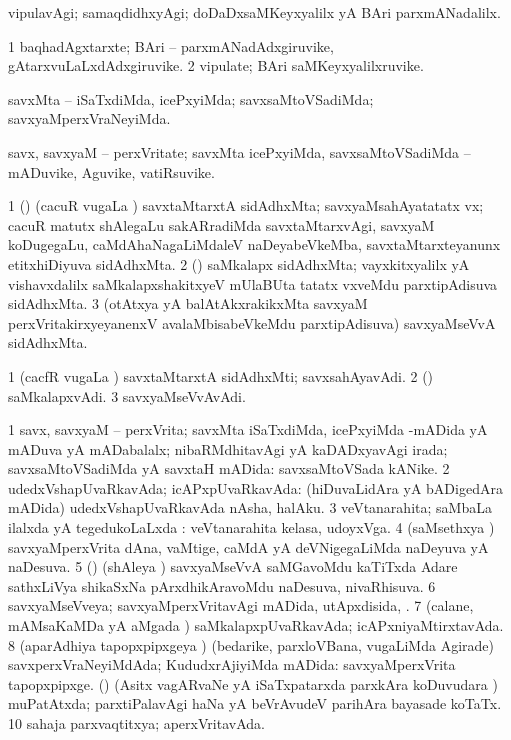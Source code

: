 \bentry
{} 
\gl{\kirxvi}
\expl{}
\bmng
vipulavAgi; samaqdidhxyAgi; doDaDxsaMKeyxyalilx yA BAri parxmANadalilx. 
\emng
\eentry

\bentry 
{} 
\gl{\nA}
\expl{}
\bmng
\bnum
\num{1} baqhadAgxtarxte; BAri -- parxmANadAdxgiruvike, gAtarxvuLaLxdAdxgiruvike. 
\num{2} vipulate; BAri saMKeyxyalilxruvike. 
\enum
\emng
\eentry

\bentry
{} 
\gl{\kirxvi}
\expl{}
\bmng
 savxMta -- iSaTxdiMda, icePxyiMda; savxsaMtoVSadiMda; savxyaMperxVraNeyiMda. 
\emng
\eentry

\bentry
{} 
\gl{\nA}
\expl{}
\bmng
 savx, savxyaM -- perxVritate; savxMta icePxyiMda, savxsaMtoVSadiMda -- mADuvike, Aguvike, vatiRsuvike. 
\emng
\eentry

\bentry 
{} 
\gl{\nA}
\expl{}
\bmng
\hypertarget{voluntarism(1)}{} 
\bnum
\num{1} (\ca) (cacuR \mo vugaLa \vi) savxtaMtarxtA sidAdhxMta; savxyaMsahAyatatatx vx; cacuR matutx shAlegaLu sakARradiMda savxtaMtarxvAgi, savxyaM koDugegaLu, caMdAhaNagaLiMdaleV naDeyabeVkeMba, savxtaMtarxteyanunx etitxhiDiyuva sidAdhxMta. 
\num{2} (\tashA) saMkalapx sidAdhxMta; vayxkitxyalilx yA vishavxdalilx saMkalapxshakitxyeV mUlaBUta tatatx vxveMdu parxtipAdisuva sidAdhxMta. 
\num{3} (otAtxya yA balAtAkxrakikxMta savxyaM perxVritakirxyeyanenxV avalaMbisabeVkeMdu parxtipAdisuva) savxyaMseVvA sidAdhxMta. 
\enum
\emng
\eentry

\bentry
{} 
\gl{\nA}
\expl{}
\bmng
\bnum
\num{1} (cacfR \mo vugaLa \vi) savxtaMtarxtA sidAdhxMti; savxsahAyavAdi. 
\num{2} (\tashA) saMkalapxvAdi. 
\num{3} savxyaMseVvAvAdi. 
\enum
\emng
\eentry

\bentry 
{} 
\gl{\gu}
\expl{}
\bmng
\bnum
\num{1} savx, savxyaM -- perxVrita; savxMta iSaTxdiMda, icePxyiMda -mADida yA mADuva yA mADabalalx; nibaRMdhitavAgi yA kaDADxyavAgi irada; savxsaMtoVSadiMda yA savxtaH mADida:  savxsaMtoVSada kANike. 
\num{2} udedxVshapUvaRkavAda; icAPxpUvaRkavAda:  (hiDuvaLidAra yA bADigedAra mADida) udedxVshapUvaRkavAda nAsha, halAku. 
\num{3} veVtanarahita; saMbaLa ilalxda yA tegedukoLaLxda :  veVtanarahita kelasa, udoyxVga. 
\num{4} (saMsethxya \vi) savxyaMperxVrita dAna, vaMtige, caMdA yA deVNigegaLiMda naDeyuva yA naDesuva. 
\num{5} (\birx) (shAleya \vi) savxyaMseVvA saMGavoMdu kaTiTxda Adare sathxLiVya shikaSxNa pArxdhikAravoMdu naDesuva, nivaRhisuva. 
\num{6} savxyaMseVveya; savxyaMperxVritavAgi mADida, utApxdisida, \mo. 
\num{7} (calane, mAMsaKaMDa yA aMgada \vi) saMkalapxpUvaRkavAda; icAPxniyaMtirxtavAda. 
\num{8} (aparAdhiya tapopxpipxgeya \vi) (bedarike, parxloVBana, \mo vugaLiMda Agirade) savxperxVraNeyiMdAda; KududxrAjiyiMda mADida:  savxyaMperxVrita tapopxpipxge. (\nAyxshA) (Asitx vagARvaNe yA iSaTxpatarxda parxkAra koDuvudara \vi) muPatAtxda; parxtiPalavAgi haNa yA beVrAvudeV parihAra bayasade koTaTx. 
\num{10} sahaja parxvaqtitxya; aperxVritavAda. 
\enum
\emng
\eentry

